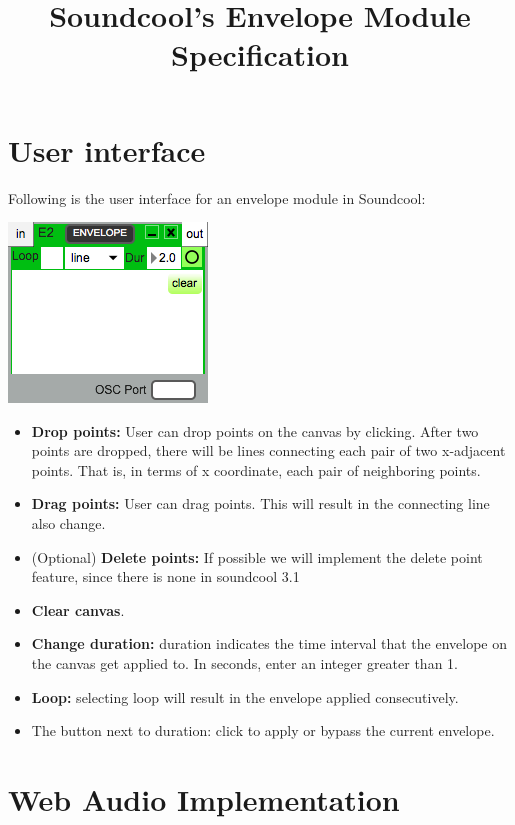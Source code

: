 \documentclass[20pt]{article}
\begin{document}
\title{Soundcool's Envelope Module Specification}
\maketitle



\section*{User interface}
Following is the user interface for an envelope module in Soundcool:

\includegraphics[scale=0.75]{gui.png} 

\begin{itemize}
    \item \textbf{Drop points:} User can drop points on the canvas by clicking. After two points are dropped, there will be lines connecting each pair of two x-adjacent points. That is, in terms of x coordinate, each pair of neighboring points. 
    \item \textbf{Drag points:} User can drag points. This will result in the connecting line also change.
    \item (Optional) \textbf{Delete points:} If possible we will implement the delete point feature, since there is none in soundcool 3.1
    \item \textbf{Clear canvas}.
    \item \textbf{Change duration:} duration indicates the time interval that the envelope on the canvas get applied to. In seconds, enter an integer greater than 1. 
    \item \textbf{Loop:} selecting loop will result in the envelope applied consecutively.
    \item The button next to duration: click to apply or bypass the current envelope. 
\end{itemize}

\newpage
\section*{Web Audio Implementation}
\end{document}
